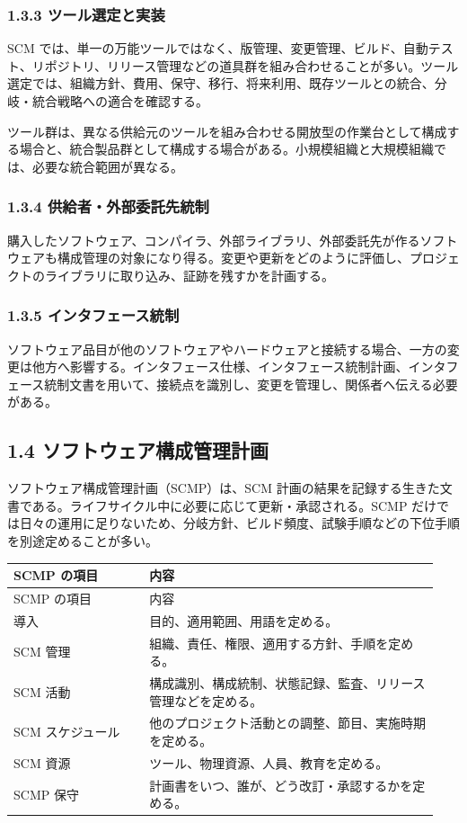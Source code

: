 \documentclass[uplatex,a4paper,11pt]{jsarticle}
\begin{document}
\subsubsection*{1.3.3 ツール選定と実装}
SCM では、単一の万能ツールではなく、版管理、変更管理、ビルド、自動テスト、リポジトリ、リリース管理などの道具群を組み合わせることが多い。ツール選定では、組織方針、費用、保守、移行、将来利用、既存ツールとの統合、分岐・統合戦略への適合を確認する。

ツール群は、異なる供給元のツールを組み合わせる開放型の作業台として構成する場合と、統合製品群として構成する場合がある。小規模組織と大規模組織では、必要な統合範囲が異なる。

\subsubsection*{1.3.4 供給者・外部委託先統制}
購入したソフトウェア、コンパイラ、外部ライブラリ、外部委託先が作るソフトウェアも構成管理の対象になり得る。変更や更新をどのように評価し、プロジェクトのライブラリに取り込み、証跡を残すかを計画する。

\subsubsection*{1.3.5 インタフェース統制}
ソフトウェア品目が他のソフトウェアやハードウェアと接続する場合、一方の変更は他方へ影響する。インタフェース仕様、インタフェース統制計画、インタフェース統制文書を用いて、接続点を識別し、変更を管理し、関係者へ伝える必要がある。

\subsection*{1.4 ソフトウェア構成管理計画}
ソフトウェア構成管理計画（SCMP）は、SCM 計画の結果を記録する生きた文書である。ライフサイクル中に必要に応じて更新・承認される。SCMP だけでは日々の運用に足りないため、分岐方針、ビルド頻度、試験手順などの下位手順を別途定めることが多い。

\begin{longtable}{p{0.30\linewidth}p{0.64\linewidth}}\toprule
SCMP の項目 & 内容 \\ \midrule
\endfirsthead\toprule
SCMP の項目 & 内容 \\ \midrule
\endhead
導入 & 目的、適用範囲、用語を定める。 \\
SCM 管理 & 組織、責任、権限、適用する方針、手順を定める。 \\
SCM 活動 & 構成識別、構成統制、状態記録、監査、リリース管理などを定める。 \\
SCM スケジュール & 他のプロジェクト活動との調整、節目、実施時期を定める。 \\
SCM 資源 & ツール、物理資源、人員、教育を定める。 \\
SCMP 保守 & 計画書をいつ、誰が、どう改訂・承認するかを定める。 \\
\bottomrule\end{longtable}
\end{document}
